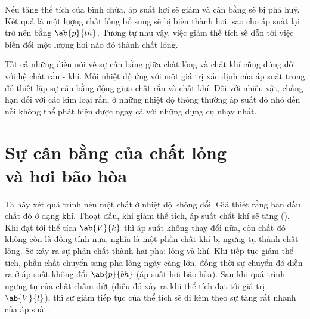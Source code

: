 Nếu tăng thể tích của bình chứa, áp suất hơi sẽ giảm và cân bằng sẽ bị phá huỷ. Kết quả là một lượng chất lỏng bổ sung sẽ bị biến thành hơi, sao cho áp suất lại trở nên bằng $\ab{p}{th}$. Tương tự như vậy, việc giảm thể tích sẽ dẫn tới việc biến đổi một lượng hơi nào đó thành chất lỏng.

Tất cả những điều nói về sự cân bằng giữa chất lỏng và chất khí cũng đúng đối với hệ chất rắn - khí. Mỗi nhiệt độ ứng với một giá trị xác định của áp suất trong đó thiết lập sự cân bằng động giữa chất rắn và chất khí. Đối với nhiều vật, chẳng hạn đối với các kim loại rắn, ở những nhiệt độ thông thường áp suất đó nhỏ đến nỗi không thể phát hiện được ngay cả với những dụng cụ nhạy nhất.

\section{Sự cân bằng của chất lỏng\\ và hơi bão hòa}\label{sec:15_3}

Ta hãy xét quá trình nén một chất ở nhiệt độ không đổi. Giả thiết rằng ban đầu chất đó ở dạng khí. Thoạt đầu, khi giảm thể tích, áp suất chất khí sẽ tăng (). Khi đạt tới thể tích $\ab{V}{k}$ thì áp suất không thay đổi nữa, còn chất đó không còn là đồng tính nữa, nghĩa là một phần chất khí bị ngưng tụ thành chất lỏng. Sẽ xảy ra sự phân chất thành hai pha: lỏng và khí. Khi tiếp tục giảm thể tích, phần chất chuyển sang pha lỏng ngày càng lớn, đồng thời sự chuyển đó diễn ra ở áp suất không đổi $\ab{p}{bh}$ (áp suất hơi bão hòa). Sau khi quá trình ngưng tụ của chất chấm dứt (điều đó xảy ra khi thể tích đạt tới giá trị $\ab{V}{l}$), thì sự giảm tiếp tục của thể tích sẽ đi kèm theo sự tăng rất nhanh của áp suất.



